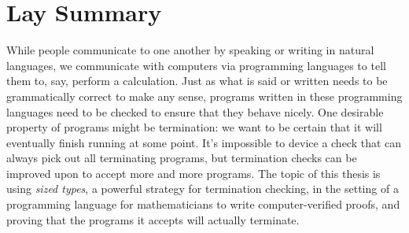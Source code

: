 \chapter{Lay Summary}

While people communicate to one another by speaking or writing in natural languages,
we communicate with computers via programming languages to tell them to, say, perform a calculation.
Just as what is said or written needs to be grammatically correct to make any sense,
programs written in these programming languages need to be checked to ensure that they behave nicely.
One desirable property of programs might be termination:
we want to be certain that it will eventually finish running at some point.
It's impossible to device a check that can always pick out all terminating programs,
but termination checks can be improved upon to accept more and more programs.
The topic of this thesis is using \emph{sized types}, a powerful strategy for termination checking,
in the setting of a programming language for mathematicians to write computer-verified proofs,
and proving that the programs it accepts will actually terminate.